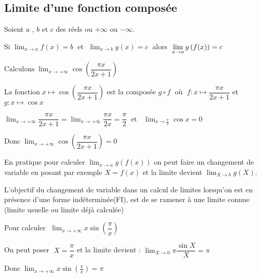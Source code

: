 
\everymath{\displaystyle}

 \summary{}
     
    \subsection{Limite d'une fonction composée}
      Soient $a$ , $b$
        et  $c$ des réels ou  $+\infty $ ou $-\infty $.
        
   \medskip
\begin{property}
Si  $ \displaystyle\lim_{x \to a}f(x)=b \;$ et $\;   \displaystyle\lim_{x \to b}g(x)=c \;$ alors $ \;   \displaystyle\lim_{x \to a}g\left(f(x)\right)=c $
\end{property}

 \medskip
       \begin{example}
      $\text{Calculons}\; \displaystyle\lim_{x \to +\infty} \cos\left(\dfrac{\pi x}{2x+1}\right)$
      
       $ \text{La fonction} \; x \mapsto \cos\left(\dfrac{\pi x}{2x+1}\right)$ est la composée $ g\circ f\; $  où $\; f: x\mapsto\dfrac{\pi x}{2x+1}$  et $g: x \mapsto \cos x $
       
        $\displaystyle\lim_{x \to +\infty} \dfrac{\pi x}{2x+1}= \displaystyle\lim_{x \to +\infty} \dfrac{\pi x}{2x }=\dfrac{\pi }{2} \;\; \text{et }\;\; \displaystyle\lim_{x \to \frac{\pi}{2}} \cos x=0$
        
      $\text{Donc}\; \displaystyle\lim_{x \to +\infty} \cos\left(\dfrac{\pi x}{2x+1}\right)=0$
   \end{example}
     \begin{remark}
       En pratique pour calculer $\displaystyle\lim_{x \to a}g\left(f(x)\right) $ on peut faire  un changement de variable en posant par exemple   $X=f(x) $  et la limite devient  $\displaystyle\lim_{X \to b}g(X)$.
       
      L’objectif du changement de variable dans un calcul de limites lorsqu’on est en présence d’une forme indéterminée(FI), est de se ramener à une limite connue (limite usuelle ou limite déjà calculée)
     \end{remark}
\begin{example}
Pour calculer $\;\displaystyle \lim_{x \to +\infty} x\sin \left(\dfrac{\pi}{x}\right)$
 
     On peut poser $ \; X=\dfrac{\pi }{x}$  et la limite devient :
      $\displaystyle\lim_{X\to 0} \pi\dfrac{\sin X }{X}=\pi $
      
       $\text{Donc}\; \displaystyle\lim_{x \to +\infty} x\sin \left(\frac{\pi}{x}\right)=\pi$
   \end{example}
